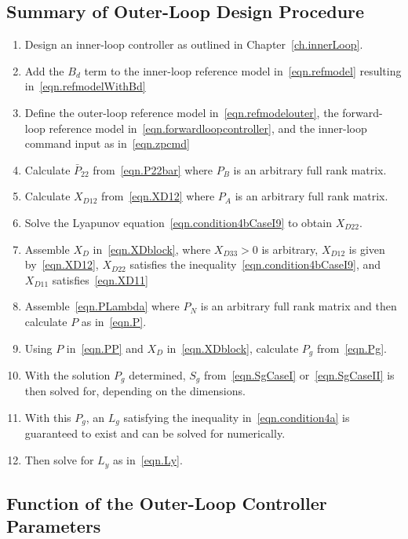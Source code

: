 \subsection{Summary of Outer-Loop Design Procedure}\label{sec.outerLoopDesignProcedureSummary}

\begin{enumerate}[1.]
  \setlength{\itemsep}{0pt}
  \item{Design an inner-loop controller as outlined in Chapter~\ref{ch.innerLoop}.}
  \item{Add the $B_{d}$ term to the inner-loop reference model in\ \eqref{eqn.refmodel} resulting in\ \eqref{eqn.refmodelWithBd}}
  \item{Define the outer-loop reference model in\ \eqref{eqn.refmodelouter}, the forward-loop reference model in\ \eqref{eqn.forwardloopcontroller}, and the inner-loop command input as in\ \eqref{eqn.zpcmd}}
  \item{Calculate $\bar{P}_{22}$ from\ \eqref{eqn.P22bar} where $P_{B}$ is an arbitrary full rank matrix.}
  \item{Calculate $X_{D12}$ from\ \eqref{eqn.XD12} where $P_{A}$ is an arbitrary full rank matrix.}
  \item{Solve the Lyapunov equation\ \eqref{eqn.condition4bCaseI9} to obtain $X_{D22}$.}
  \item{Assemble $X_{D}$ in\ \eqref{eqn.XDblock}, where $X_{D33}>0$ is arbitrary, $X_{D12}$ is given by\ \eqref{eqn.XD12}, $X_{D22}$ satisfies the inequality\ \eqref{eqn.condition4bCaseI9}, and $X_{D11}$ satisfies\ \eqref{eqn.XD11}}
  \item{Assemble\ \eqref{eqn.PLambda} where $P_{N}$ is an arbitrary full rank matrix and then calculate $P$ as in\ \eqref{eqn.P}.}
  \item{Using $P$ in\ \eqref{eqn.PP} and $X_{D}$ in\ \eqref{eqn.XDblock},  calculate $P_{g}$ from\ \eqref{eqn.Pg}.}
  \item{With the solution $P_{g}$ determined, $S_{g}$ from\ \eqref{eqn.SgCaseI} or\ \eqref{eqn.SgCaseII} is then solved for, depending on the dimensions.}
  \item{With this $P_{g}$, an $L_{g}$ satisfying the inequality in\ \eqref{eqn.condition4a} is guaranteed to exist and can be solved for numerically.}
  \item{Then solve for $L_{y}$ as in\ \eqref{eqn.Ly}.}
\end{enumerate}

\subsection{Function of the Outer-Loop Controller Parameters}

